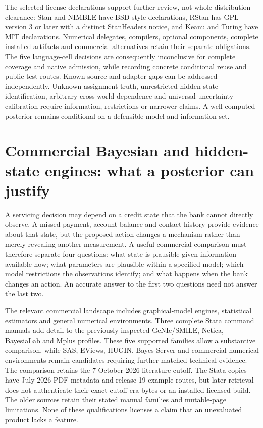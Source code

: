The selected license declarations support further review, not whole-distribution clearance: Stan and NIMBLE have BSD-style declarations, RStan has GPL version 3 or later with a distinct StanHeaders notice, and Keanu and Turing have MIT declarations. Numerical delegates, compilers, optional components, complete installed artifacts and commercial alternatives retain their separate obligations. The five language-cell decisions are consequently inconclusive for complete coverage and native admission, while recording concrete conditional reuse and public-test routes. Known source and adapter gaps can be addressed independently. Unknown assignment truth, unrestricted hidden-state identification, arbitrary cross-world dependence and universal uncertainty calibration require information, restrictions or narrower claims. A well-computed posterior remains conditional on a defensible model and information set.~\citep{exec25_bsw_stan,exec25_bsw_rstan,exec25_bsw_nimble,exec25_bsw_keanu,exec25_bsw_turing,exec25_bsw_choice}


\section{Commercial Bayesian and hidden-state engines: what a posterior can justify}
\label{exec22:state-scope}

A servicing decision may depend on a credit state that the bank cannot directly
observe. A missed payment, account balance and contact history provide evidence
about that state, but the proposed action changes a mechanism rather than merely
revealing another measurement. A useful commercial comparison must therefore
separate four questions: what state is plausible given information available now;
what parameters are plausible within a specified model; which model restrictions
the observations identify; and what happens when the bank changes an action.
An accurate answer to the first two questions need not answer the last two.

The relevant commercial landscape includes graphical-model engines, statistical
estimators and general numerical environments. Three complete Stata command
manuals add detail to the previously inspected GeNIe/SMILE, Netica, BayesiaLab and
Mplus profiles. These five supported families allow a substantive comparison,
while SAS, EViews, HUGIN, Bayes Server and commercial numerical environments
remain candidates requiring further matched technical evidence. The comparison
retains the 7 October 2026 literature cutoff. The Stata copies have July 2026 PDF
metadata and release-19 example routes, but later retrieval does not authenticate
their exact cutoff-era bytes or an installed licensed build. The older sources
retain their stated manual families and mutable-page limitations. None of these
qualifications licenses a claim that an unevaluated product lacks a feature.

